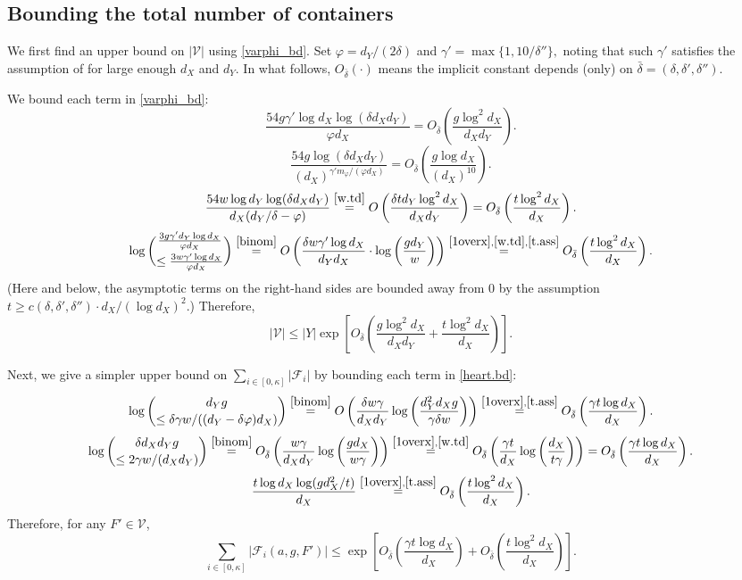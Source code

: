 \documentclass[10pt,a4paper]{amsart}
\theoremstyle{definition}
\newcommand{\cF}{\mathcal{F} }
\newcommand{\cV}{\mathcal{V} }
\newcommand{\beq}[1]{\begin{equation}\label{#1}}
\newcommand{\enq}[0]{\end{equation}}
\newcommand{\gd}[0]{\delta }
\newcommand{\0}[0]{\emptyset}
\begin{document}
\subsection{Bounding the total number of containers} We first find an upper bound on $|\mathcal{V}|$ using \eqref{varphi_bd}. Set $\varphi=d_Y/(2\delta)$ and $\gamma' =\max\{1,10/\gd''\},$ noting that such $\gamma'$ satisfies the assumption of  for large enough $d_X$ and $d_Y.$ In what follows, $O_{{\bar\gd}}(\cdot)$ means the implicit constant depends (only) on $\bar \gd=(\gd, \gd', \gd'')$.

We bound each term in \eqref{varphi_bd}:
\[\frac{54g\gamma'\log d_X \log (\delta d_Xd_Y)}{\varphi d_X}=O_{\bar \gd}\left(\frac{g\log^2 d_X}{d_Xd_Y}\right).\]
\[\frac{54g\log (\delta d_Xd_Y)}{(d_X)^{\gamma'm_\varphi/(\varphi d_X)}}=O_{\bar \gd}\left(\frac{g\log d_X}{(d_X)^{10}}\right).\]
\[\frac{54w\log d_Y \log (\delta d_Xd_Y)}{d_X(d_Y/\gd-\varphi)}\stackrel{\eqref{w.td}}{=}O\left(\frac{\gd td_Y\log^2 d_X}{d_Xd_Y}\right)=O_{\bar\gd}\left(\frac{t\log^2 d_X}{d_X}\right).\]
\[\log {\frac{3g\gamma'd_Y\log d_X}{\varphi d_X}\choose \le \frac{3w\gamma'\log d_X}{\varphi d_X}}\stackrel{\eqref{binom}}{=}O\left(\frac{\gd w\gamma' \log d_X}{d_Yd_X}\cdot \log\left(\frac{gd_Y}{w}\right)\right)\stackrel{\eqref{1overx},\eqref{w.td}, \eqref{t.ass}}{=}O_{\bar\gd}\left(\frac{t\log^2  d_X}{d_X}\right).\]
(Here and below, the asymptotic terms on the right-hand sides are bounded away from 0 by the assumption $t \ge c(\gd, \gd', \gd'')\cdot d_X/(\log d_X)^2$.) Therefore,
\beq{v.total} |\cV|\leq|Y| \exp\left[O_{\bar \gd} \left(\frac{g\log^2d_X}{d_Xd_Y}+\frac{t\log^2 d_X}{d_X}\right)\right].\enq

Next, we give a simpler upper bound on $\sum_{i \in [0, \kappa]}|\cF_i|$ by bounding each term in \eqref{heart.bd}:
\[\log{d_Yg \choose \le \delta \gamma w/((d_Y-\delta \varphi)d_X)}\stackrel{\eqref{binom}}{=}O\left(\frac{\gd w\gamma}{d_Xd_Y}\log\left(\frac{d_Y^2d_Xg}{\gamma\delta w}\right)\right)\stackrel{\eqref{1overx},\eqref{t.ass}}{=}O_{\bar\gd}\left(\frac{\gamma t \log d_X}{d_X}\right).\]
\[\log{\delta d_X d_Y g \choose \le 2\gamma w/(d_Xd_Y)}\stackrel{\eqref{binom}}{=}O_{\bar\gd}\left(\frac{w\gamma}{d_Xd_Y}\log\left(\frac{gd_X}{w\gamma}\right)\right)\stackrel{\eqref{1overx},\eqref{w.td}}{=}O_{\bar\gd}\left(\frac{\gamma t}{d_X}\log\left(\frac{d_X}{t\gamma}\right)\right)=O_{\bar\gd}\left(\frac{\gamma t\log d_X}{d_X}\right).\]
\[\frac{t\log d_X \log(gd_X^2/t)}{d_X}\stackrel{\eqref{1overx},\eqref{t.ass}}{=}O_{\bar\gd}\left(\frac{t\log^2 d_X}{d_X}\right).\]
Therefore, for any $F'\in \cV$,
    \beq{w.cost} \sum_{i \in [0, \kappa]}|\cF_i(a,g,F')|\le \exp\left[O_{\bar \gd}\left(\frac{\gamma t\log d_X}{d_X}\right)+O_{\bar\gd}\left(\frac{t\log^2 d_X}{d_X}\right)\right].\enq
\end{document}
